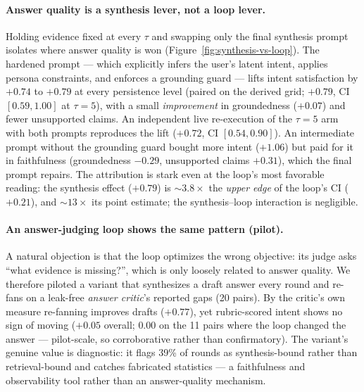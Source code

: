 \paragraph{Answer quality is a synthesis lever, not a loop lever.}
Holding evidence fixed at every $\tau$ and swapping only the final synthesis
prompt isolates where answer quality is won
(Figure~\ref{fig:synthesis-vs-loop}). The hardened prompt --- which
explicitly infers the user's latent intent, applies persona constraints, and
enforces a grounding guard --- lifts intent satisfaction by $+0.74$ to
$+0.79$ at every persistence level (paired on the derived grid; $+0.79$,
CI $[0.59, 1.00]$ at $\tau{=}5$), with a small \emph{improvement} in
groundedness ($+0.07$) and fewer unsupported claims. An independent live
re-execution of the $\tau{=}5$ arm with both prompts reproduces the lift
($+0.72$, CI $[0.54, 0.90]$).
An intermediate prompt without the grounding guard bought more intent
($+1.06$) but paid for it in faithfulness (groundedness $-0.29$, unsupported
claims $+0.31$), which the final prompt repairs.
The attribution is stark even at the loop's most favorable reading: the
synthesis effect ($+0.79$) is ${\sim}3.8\times$ the \emph{upper edge} of the
loop's CI ($+0.21$), and ${\sim}13\times$ its point estimate; the
synthesis--loop interaction is negligible.

\paragraph{An answer-judging loop shows the same pattern (pilot).}
A natural objection is that the loop optimizes the wrong objective: its judge
asks ``what evidence is missing?'', which is only loosely related to answer
quality. We therefore piloted a variant that synthesizes a draft answer every
round and re-fans on a leak-free \emph{answer critic}'s reported gaps
(20 pairs). By the critic's own measure re-fanning improves drafts ($+0.77$),
yet rubric-scored intent shows no sign of moving ($+0.05$ overall; $0.00$ on
the 11 pairs where the loop changed the answer --- pilot-scale, so
corroborative rather than confirmatory).
The variant's genuine value is diagnostic: it flags 39\% of rounds as
synthesis-bound rather than retrieval-bound and catches fabricated statistics
--- a faithfulness and observability tool rather than an answer-quality
mechanism.

